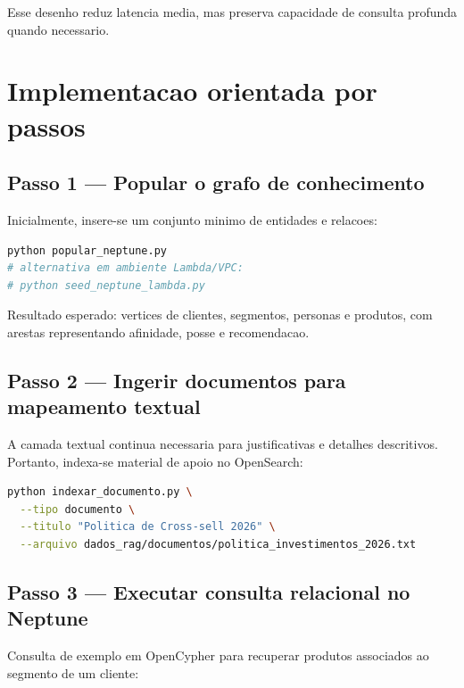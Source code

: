 Esse desenho reduz latencia media, mas preserva capacidade de consulta
profunda quando necessario.

\section{Implementacao orientada por passos}

\subsection{Passo 1 --- Popular o grafo de conhecimento}

Inicialmente, insere-se um conjunto minimo de entidades e relacoes:

\begin{lstlisting}[language=bash,
  caption={Carga inicial do grafo para o laboratorio.},
  label={lst:seed_neptune_lab}]
python popular_neptune.py
# alternativa em ambiente Lambda/VPC:
# python seed_neptune_lambda.py
\end{lstlisting}

Resultado esperado: vertices de clientes, segmentos, personas e produtos,
com arestas representando afinidade, posse e recomendacao.

\subsection{Passo 2 --- Ingerir documentos para mapeamento textual}

A camada textual continua necessaria para justificativas e detalhes
descritivos. Portanto, indexa-se material de apoio no OpenSearch:

\begin{lstlisting}[language=bash,
  caption={Ingestao de documento no pipeline GraphRAG.},
  label={lst:indexar_documento_graphrag}]
python indexar_documento.py \
  --tipo documento \
  --titulo "Politica de Cross-sell 2026" \
  --arquivo dados_rag/documentos/politica_investimentos_2026.txt
\end{lstlisting}

\subsection{Passo 3 --- Executar consulta relacional no Neptune}

Consulta de exemplo em OpenCypher para recuperar produtos associados ao
segmento de um cliente:

